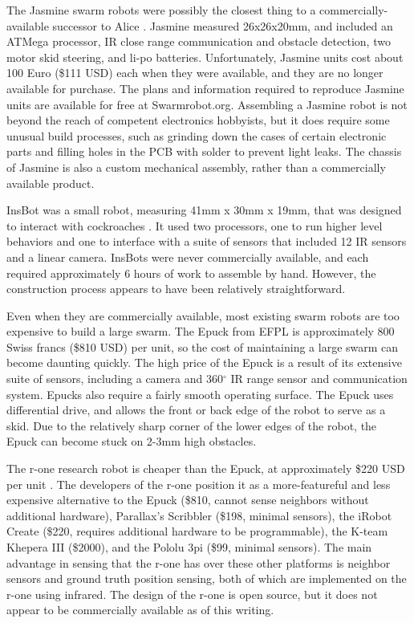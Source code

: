 The Jasmine swarm robots were possibly the closest thing to a commercially-available successor to Alice  \cite{kernbach2011swarmrobot}.
Jasmine measured 26x26x20mm, and included an ATMega processor, IR close range communication and obstacle detection, two motor skid steering, and li-po batteries.
Unfortunately, Jasmine units cost about 100 Euro (\$111 USD) each when they were available, and they are no longer available for purchase. 
The plans and information required to reproduce Jasmine units are available for free at Swarmrobot.org.
Assembling a Jasmine robot is not beyond the reach of competent electronics hobbyists, but it does require some unusual build processes, such as grinding down the cases of certain electronic parts and filling holes in the PCB with solder to prevent light leaks. 
The chassis of Jasmine is also a custom mechanical assembly, rather than a commercially available product. 

InsBot was a small robot, measuring 41mm x 30mm x 19mm, that was designed to interact with cockroaches \cite{colot2004insbot}.
It used two processors, one to run higher level behaviors and one to interface with a suite of sensors that included 12 IR sensors and a linear camera. 
InsBots were never commercially available, and each required approximately 6 hours of work to assemble by hand. 
However, the construction process appears to have been relatively straightforward. 

Even when they are commercially available, most existing swarm robots are too expensive to build a large swarm.
The Epuck from EFPL is approximately 800 Swiss francs (\$810 USD) per unit, so the cost of maintaining a large swarm can become daunting quickly. 
The high price of the Epuck is a result of its extensive suite of sensors, including a camera and 360$^{\circ}$ IR range sensor and communication system. 
Epucks also require a fairly smooth operating surface.
The Epuck uses differential drive, and allows the front or back edge of the robot to serve as a skid. 
Due to the relatively sharp corner of the lower edges of the robot, the Epuck can become stuck on 2-3mm high obstacles. 

The r-one research robot is cheaper than the Epuck, at approximately \$220 USD per unit \cite{mclurkin2013low}. 
The developers of the r-one position it as a more-featureful and less expensive alternative to the Epuck (\$810, cannot sense neighbors without additional hardware), Parallax's Scribbler (\$198, minimal sensors), the iRobot Create (\$220, requires additional hardware to be programmable), the K-team Khepera III (\$2000), and the Pololu 3pi (\$99, minimal sensors). The main advantage in sensing that the r-one has over these other platforms is neighbor sensors and ground truth position sensing, both of which are implemented on the r-one using infrared.
The design of the r-one is open source, but it does not appear to be commercially available as of this writing.   

